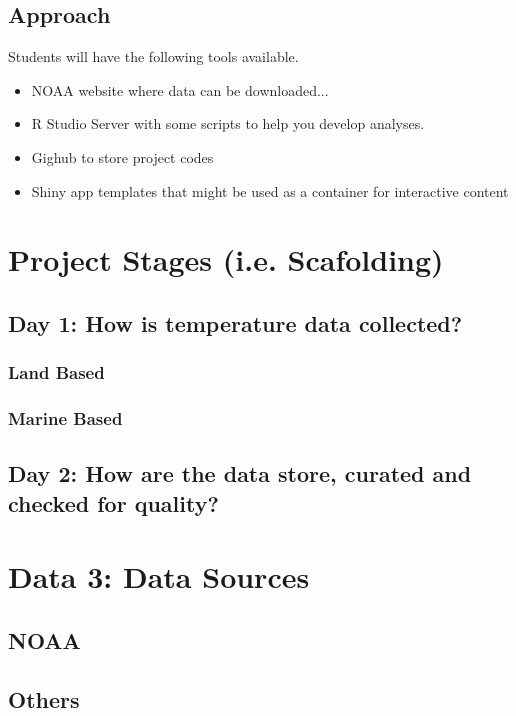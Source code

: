 \documentclass{article}\usepackage[]{graphicx}\usepackage[]{color}
\begin{document}
\subsection{Approach}

Students will have the following tools available.

\begin{itemize}
  \item NOAA website where data can be downloaded...
  \item R Studio Server with some scripts to help you develop analyses.
  \item Gighub to store project codes
  \item Shiny app templates that might be used as a container for interactive content
\end{itemize}

\section{Project Stages (i.e. Scafolding)}

\subsection{Day 1: How is temperature data collected?}

\subsubsection{Land Based}

\subsubsection{Marine Based}

\subsection{Day 2: How are the data store, curated and checked for quality?}

\section{Data 3: Data Sources}

\subsection{NOAA}

\subsection{Others}
\end{document}
